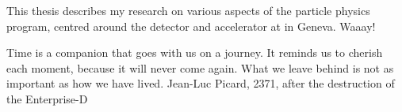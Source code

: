 \begin{preface}
  This thesis describes my research on various aspects of the \LHCb
  particle physics program, centred around the \LHCb detector and \LHC
  accelerator at \CERN in Geneva. Waaay!

  \noindent
\end{preface}

\tableofcontents

\listoffigures
\listoftables

\frontquote%
{Time is a companion that goes with us on a journey. It reminds us to cherish
  each moment, because it will never come again. What we leave behind is not as
  important as how we have lived.}%
{Jean-Luc Picard, 2371, after the destruction of the Enterprise-D}
